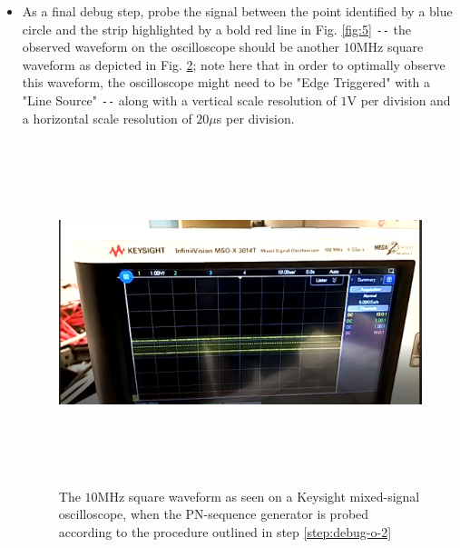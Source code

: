 \documentclass[12pt, draftcls, onecolumn]{IEEEtran}
\begin{document}
\begin{enumerate}
{\begin{itemize}
\begin{figure}
            \caption{The $10$MHz square waveform as seen on a Keysight mixed-signal oscilloscope, when the PN-sequence generator is probed according to the procedure outlined in step \ref{step:debug-o-1}}
            \label{fig:6}
       \end{figure}
       \item \label{step:debug-o-2} As a final debug step, probe the signal between the point identified by a blue circle and the strip highlighted by a bold red line in Fig. \ref{fig:5} \texttt{-{}-} the observed waveform on the oscilloscope should be another $10$MHz square waveform as depicted in Fig. \ref{fig:7}; note here that in order to optimally observe this waveform, the oscilloscope might need to be "Edge Triggered" with a "Line Source" \texttt{-{}-} along with a vertical scale resolution of $1$V per division and a horizontal scale resolution of $20\mu$s per division.
       \begin{figure}
            \centering
            \includegraphics[width=15cm, height=10cm]{13.png}
            \caption{The $10$MHz square waveform as seen on a Keysight mixed-signal oscilloscope, when the PN-sequence generator is probed according to the procedure outlined in step \ref{step:debug-o-2}}
            \label{fig:7}
       \end{figure}
    \end{itemize}}
\end{enumerate}
\end{document}
